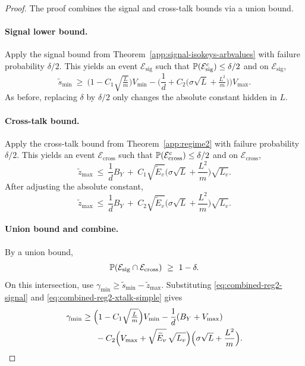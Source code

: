 \begin{proof}
The proof combines the signal and cross-talk bounds via a union bound.
\paragraph{Signal lower bound.}
Apply the signal bound from Theorem~\ref{app:signal-isokeys-arbvalues} with failure probability \(\delta/2\).
This yields an event \(\mathcal E_{\mathrm{sig}}\) such that
\(
\mathbb{P}(\mathcal E_{\mathrm{sig}}^c)\le \delta/2
\)
and on \(\mathcal E_{\mathrm{sig}}\),
\begin{equation}
\widetilde{s}_{\min}
\ \ge\
\Big(1-C_{1}\sqrt{\tfrac{L}{m}}\Big)V_{\min}
-
\Big(\frac{1}{d}+C_{2}\big(\sigma\sqrt{L}+\tfrac{L^2}{m}\big)\Big)V_{\max}.
\label{eq:combined-reg2-signal}
\end{equation}
As before, replacing \(\delta\) by \(\delta/2\) only changes the absolute constant hidden in \(L\).

\paragraph{Cross-talk bound.}
Apply the cross-talk bound from Theorem~\ref{app:regime2} with failure probability \(\delta/2\).
This yields an event \(\mathcal E_{\mathrm{cross}}\) such that
\(
\mathbb{P}(\mathcal E_{\mathrm{cross}}^c)\le \delta/2
\)
and on \(\mathcal E_{\mathrm{cross}}\),
\begin{equation}
\widetilde{z}_{\max}
\ \le\
\frac{1}{d}B_{Y}
\ +\ C_{1}\sqrt{\widetilde{E}_v}\Big(\sigma\sqrt{L}+\frac{L^2}{m}\Big)\sqrt{L_v}.
\label{eq:combined-reg2-xtalk}
\end{equation}
After adjusting the absolute constant,
\begin{equation}
\widetilde{z}_{\max}
\ \le\
\frac{1}{d}B_{Y}
\ +\ C_{2}\sqrt{\widetilde{E}_v}\Big(\sigma\sqrt{L}+\frac{L^2}{m}\Big)\sqrt{L_v}.
\label{eq:combined-reg2-xtalk-simple}
\end{equation}

\paragraph{Union bound and combine.}
By a union bound,
\[
\Pbb(\mathcal E_{\mathrm{sig}}\cap\mathcal E_{\mathrm{cross}})\ \ge\ 1-\delta.
\]
On this intersection, use \(\gamma_{\min}\ge \widetilde{s}_{\min}-\widetilde{z}_{\max}\).
Substituting \eqref{eq:combined-reg2-signal} and \eqref{eq:combined-reg2-xtalk-simple} gives
\begin{align}
\gamma_{\min}
&\ge
\Big(1-C_{1}\sqrt{\tfrac{L}{m}}\Big)V_{\min}
-
\frac{1}{d}(B_{Y}+V_{\max})
\notag\\
&\hspace{1.6em}
-
C_{2}\Big(V_{\max}+\sqrt{\widetilde{E}_v}\,\sqrt{L_v}\Big)\Big(\sigma\sqrt{L}+\frac{L^2}{m}\Big).
\label{eq:combined-reg2-combined}
\end{align}


\end{proof}
